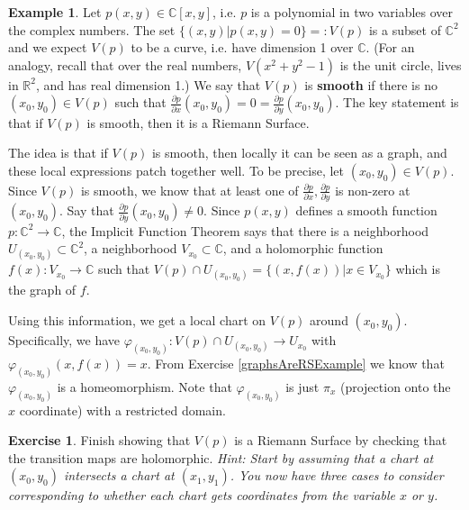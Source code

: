 \documentclass[12pt]{book}%
\theoremstyle{plain}
\theoremstyle{definition}
\newtheorem{example}[theorem]{Example}
\newtheorem{exercise}{Exercise}
\theoremstyle{remark}
\def\to{\rightarrow}
\def\bC{{\mathbb{C}}}
\def\bR{{\mathbb{R}}}
\newcommand{\del}{\partial}
\begin{document}
\begin{example}
\label{smoothCurveExample}
Let $p(x,y)\in\bC[x,y]$, i.e. $p$ is a polynomial in two variables over the complex numbers. The set $\{(x,y)|p(x,y)=0\}=:V(p)$ is a subset of $\bC^2$ and we expect $V(p)$ to be a curve, i.e. have dimension 1 over $\bC$. (For an analogy, recall that over the real numbers, $V(x^2+y^2-1)$ is the unit circle, lives in $\bR^2$, and has real dimension 1.) We say that $V(p)$ is \textbf{smooth} if there is no $(x_0,y_0)\in V(p)$ such that $\frac{\del p}{\del x}(x_0,y_0) =0 = \frac{\del p}{\del y}(x_0,y_0)$. The key statement is that if $V(p)$ is smooth, then it is a Riemann Surface.

The idea is that if $V(p)$ is smooth, then locally it can be seen as a graph, and these local expressions patch together well. To be precise, let $(x_0,y_0)\in V(p)$. Since $V(p)$ is smooth, we know that at least one of $\frac{\del p}{\del x}, \frac{\del p}{\del y}$ is non-zero at $(x_0,y_0)$. Say that $\frac{\del p}{\del y}(x_0,y_0)\neq 0$. Since $p(x,y)$ defines a smooth function $p:\bC^2 \to \bC$, the Implicit Function Theorem says that there is a neighborhood $U_{(x_0,y_0)} \subset \bC^2$, a neighborhood $V_{x_0}\subset\bC$, and a holomorphic function $f(x):V_{x_0} \to \bC$ such that $V(p) \cap U_{(x_0,y_0)} = \{(x,f(x))|x\in V_{x_0}\}$ which is the graph of $f$.

Using this information, we get a local chart on $V(p)$ around $(x_0,y_0)$. Specifically, we have $\varphi_{(x_0,y_0)}:V(p) \cap U_{(x_0,y_0)} \to U_{x_0}$ with $\varphi_{(x_0,y_0)}(x,f(x)) = x$. From Exercise \ref{graphsAreRSExample} we know that $\varphi_{(x_0,y_0)}$  is a homeomorphism. Note that  $\varphi_{(x_0,y_0)}$ is just $\pi_x$ (projection onto the $x$ coordinate) with a restricted domain.

\begin{figure}
\label{schematicCurve}
\end{figure}

\begin{exercise}
Finish showing that $V(p)$ is a Riemann Surface by checking that the transition maps are holomorphic. \textit{Hint: Start by assuming that a chart at $(x_0,y_0)$ intersects a chart at $(x_1,y_1)$. You now have three cases to consider corresponding to whether each chart gets coordinates from the variable $x$ or $y$.}
\end{exercise}

\end{example}
\end{document}
